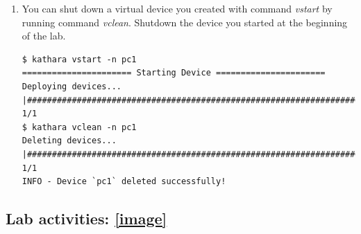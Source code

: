 \documentclass[12pt]{book}
\begin{document}
\begin{enumerate}[label=Activity \arabic*:]
\item You can shut down a virtual device you created with command \emph{vstart} by running command \emph{vclean}. Shutdown the device you started at the beginning of the lab.

\begin{lstlisting}
$ kathara vstart -n pc1
====================== Starting Device ======================
Deploying devices... |##############################################################################| 1/1
$ kathara vclean -n pc1
Deleting devices... |###############################################################################| 1/1
INFO - Device `pc1` deleted successfully!
\end{lstlisting}
\end{enumerate}

\subsection{Lab activities: \ref{image}}
\end{document}
